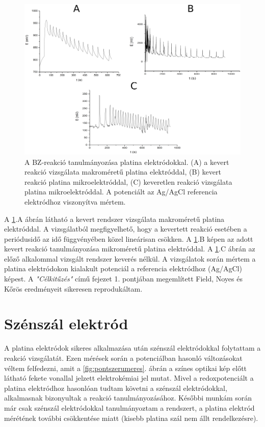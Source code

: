 \begin{figure}[!h]
\centering
\includegraphics[width=1\textwidth]{img/platina_meres.png}
\caption{A BZ-reakció tanulmányozása platina elektródokkal. (A) a kevert reakció vizsgálata makroméretű platina elektróddal, (B) kevert reakció platina mikroelektróddal, (C) keveretlen reakció vizsgálata platina mikroelektróddal. A potenciált az Ag/AgCl referencia elektródhoz viszonyítva mértem.}
\label{fig:platina_meres}
\end{figure}
A \ref{fig:platina_meres}.A ábrán látható a kevert rendszer vizsgálata makroméretű platina elektróddal. A vizsgálatból megfigyelhető, hogy a kevertett reakció esetében a periódusidő az idő függvényében közel lineárisan csökken. A \ref{fig:platina_meres}.B képen az adott kevert reakció tanulmányozása mikroméretű platina elektróddal. A \ref{fig:platina_meres}.C ábrán az előző alkalommal vizsgált rendszer keverés nélkül. A vizsgálatok során mértem a platina elektródokon kialakult potenciál a referencia elektródhoz (Ag/AgCl) képest. A \emph{"Célkitűzés"} című fejezet 1. pontjában megemlített Field, Noyes és Kőrös eredményeit \cite{noyes1972oscillations} sikeresen reprodukáltam.  

\section{Szénszál elektród}
A platina elektródok sikeres alkalmazása után szénszál elektródokkal folytattam a reakció vizsgálatát. Ezen mérések során a potenciálban hasonló változásokat véltem felfedezni, amit a \ref{fig:pontszerumeres}. ábrán a színes optikai kép előtt látható fekete vonallal jelzett elektrokémiai jel mutat. Mivel a redoxpotenciált a platina elektródhoz hasonlóan tudtam követni a szénszál elektródokkal, alkalmasnak bizonyultak a reakció tanulmányozásához. Későbbi munkám során már csak szénszál elektródokkal tanulmányoztam a rendszert, a platina elektród mérétének további csökkentése miatt (kisebb platina szál nem állt rendelkezésre).
